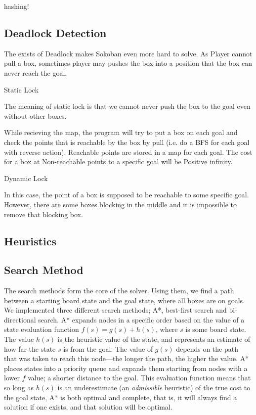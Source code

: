 \documentclass[a4paper,11pt]{article}
\begin{document}
hashing!

\subsection{Deadlock Detection}
The exists of Deadlock makes Sokoban even more hard to solve. As Player cannot
pull a box, sometimes player may pushes the box into a position that the box can
never reach the goal.

Static Lock

The meaning of static lock is that we cannot never push the box to the goal even
without other boxes.

While recieving the map, the program will try to put a box on each goal and
check the points that is reachable by the box by pull (i.e. do a BFS for each
goal with reverse action). Reachable points are stored in a map for each
goal. The cost for a box at Non-reachable points to a specific goal will be
Positive infinity.

Dynamic Lock

In this case, the point of a box is supposed to be reachable to some specific
goal. However, there are some boxes blocking in the middle and it is impossible
to remove that blocking box.

\subsection{Heuristics}

\subsection{Search Method}
The search methods form the core of the solver. Using them, we find a path
between a starting board state and the goal state, where all boxes are on
goals. We implemented three different search methods; A*, best-first search and
bi-directional search. A* expands nodes in a specific order based on the value
of a state evaluation function $f(s)=g(s)+h(s)$, where $s$ is some board
state. The value $h(s)$ is the heuristic value of the state, and represents an
estimate of how far the state $s$ is from the goal. The value of $g(s)$ depends
on the path that was taken to reach this node---the longer the path, the higher
the value. A* places states into a priority queue and expands them starting from
nodes with a lower $f$ value; a shorter distance to the goal. This evaluation
function means that so long as $h(s)$ is an underestimate (an \emph{admissible}
heuristic) of the true cost to the goal state, A* is both optimal and complete,
that is, it will always find a solution if one exists, and that solution will be
optimal\cite{aima}.
\end{document}

